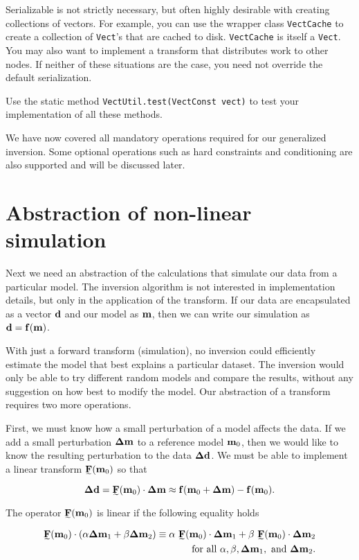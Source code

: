 \documentclass[12pt]{article}
\begin{document}
Serializable is not strictly necessary, but
often highly desirable with creating
collections of vectors.  For example, you can
use the wrapper class \texttt{VectCache} to
create a collection of \texttt{Vect}'s that
are cached to disk.  \texttt{VectCache} is
itself a \texttt{Vect}.  You may also want to
implement a transform that distributes work
to other nodes.  If neither of these
situations are the case, you need not override
the default serialization.

Use the static method
\texttt{VectUtil.test(VectConst vect)} to
test your implementation of all these
methods.

We have now covered all mandatory operations
required for our generalized inversion.  Some
optional operations such as hard constraints
and conditioning are also supported and will
be discussed later.

\section {Abstraction of non-linear
simulation}

Next we need an abstraction of the
calculations that simulate our data from a
particular model.  The inversion algorithm is
not interested in implementation details, but
only in the application of the transform.  If
our data are encapsulated as a vector ${{\mbox{\boldmath $\bf d$}}}$
and our model as ${{\mbox{\boldmath $\bf m$}}}$, then we can write our
simulation as ${{\mbox{\boldmath $\bf d$}}} = {{\mbox{\boldmath $\bf f$}}} ( {{\mbox{\boldmath $\bf m$}}} )$.

With just a forward transform (simulation),
no inversion could efficiently estimate the
model that best explains a particular
dataset.  The inversion would only be able to
try different random models and compare the
results, without any suggestion on how best
to modify the model.  Our abstraction of a
transform requires two more operations.

First, we must know how a small perturbation
of a model affects the data.  If we add a
small perturbation ${{\mbox{\boldmath $\bf \Delta$}} {{\mbox{\boldmath $\bf m$}}}}$ to a reference
model ${{\mbox{\boldmath $\bf m$}}_0}$, then we would like to know the
resulting perturbation to the data ${{\mbox{\boldmath $\bf \Delta$}} {{\mbox{\boldmath $\bf d$}}}}$.
We must be able to implement a linear
transform $\Ftz$ so that

\begin{equation}
\ddv = \Ftz  \cdot \dmv \approx \fv (\mzv + \dmv) - \fv ( \mzv ) .  
\end{equation}

\noindent The operator $\Ftz$ is linear if
the following equality holds

\begin{eqnarray}
\Ftz \cdot (\alpha \dmv_1 + \beta \dmv_2)
  \equiv \alpha ~ \Ftz \cdot \dmv_1 + \beta ~ \Ftz \cdot \dmv_2 \\ 
~\mbox{for all}~ \alpha, \beta, \dmv_1, ~\mbox{and}~ \dmv_2 .
\nonumber 
\end{eqnarray}
\end{document}
